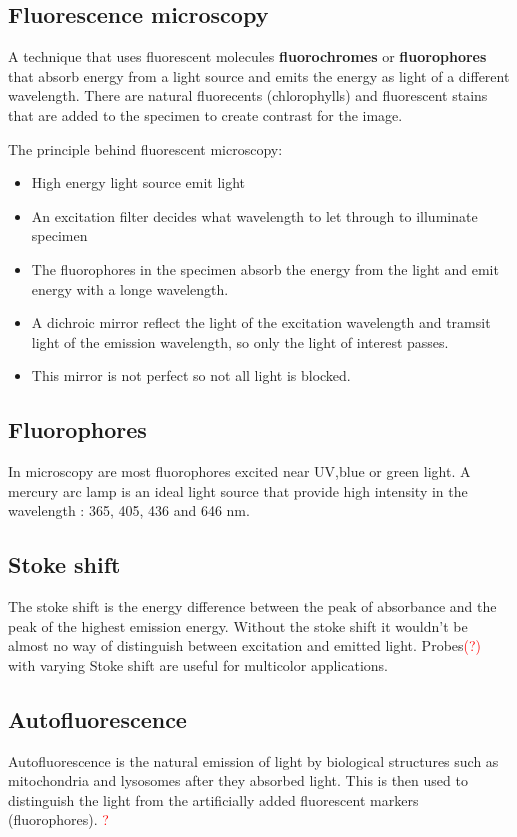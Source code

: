 	 \subsection{Fluorescence microscopy}
	 A technique that uses fluorescent molecules \textbf{fluorochromes} or \textbf{fluorophores} that absorb energy from a light source and emits the energy as light of a different wavelength. There are natural fluorecents (chlorophylls) and fluorescent stains that are added to the specimen to create contrast for the image.

	 The principle behind fluorescent microscopy: 

	 \begin{itemize}
	 	\item High energy light source emit light 
	 	\item An excitation filter decides what wavelength to let through to illuminate specimen
	 	\item The fluorophores in the specimen absorb the energy from the light and emit energy with a longe wavelength. 
	 	\item A dichroic mirror reflect the light of the excitation wavelength and tramsit light of the emission wavelength, so only the light of interest passes.
	 	\item This mirror is not perfect so not all light is blocked. 
	 \end{itemize}

	 \subsection{Fluorophores}
	 In microscopy are most fluorophores excited near UV,blue or green light. A mercury arc lamp is an ideal light source that provide high intensity in the wavelength : 365, 405, 436 and 646 nm. 

	 \subsection{Stoke shift}
	 The stoke shift is the energy difference between the peak of absorbance and the peak of the highest emission energy. Without the stoke shift it wouldn't be almost no way of distinguish between excitation and emitted light. Probes\textcolor{red}{(?)} with varying Stoke shift are useful for multicolor applications. 

	 \subsection{Autofluorescence}
	 Autofluorescence is the natural emission of light by biological structures such as mitochondria and lysosomes after they absorbed light. This is then used to distinguish the light from the artificially added fluorescent markers (fluorophores). \textcolor{red}{?} 

